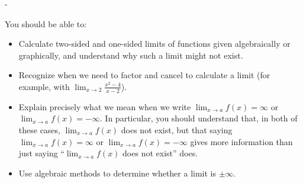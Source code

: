 \documentclass{article}
\makeatletter
\newlength{\tipmargin}
\renewenvironment{framed}{
  \setlength{\tipmargin}{\textwidth-\linewidth}
  \advance\@totalleftmargin-\tipmargin
  \def\FrameCommand{\hspace{\tipmargin}\fbox}%
  \advance\linewidth\tipmargin
  \MakeFramed {\advance\hsize-\width \FrameRestore}%
}
{\endMakeFramed}
\makeatother
\begin{document}

\begin{problemonly}
  \begin{framed}

You should be able to:
    \begin{itemize}[topsep=0pt,partopsep=0pt,parsep=8pt,itemsep=0pt]
    \item Calculate two-sided and one-sided limits of functions given algebraically or graphically, and understand why such a limit might not exist.

    \item Recognize when we need to factor and cancel to calculate a limit (for example, with $\displaystyle \lim_{x \to 2} \frac{x^2 - 4}{x - 2}$).

    \item Explain precisely what we mean when we write $\displaystyle \lim_{x \to a} f(x) = \infty$ or $\displaystyle \lim_{x \to a} f(x) = -\infty$. In particular, you should understand that, in both of these cases, $\displaystyle \lim_{x \to a} f(x)$ does not exist, but that saying $\displaystyle \lim_{x \to a} f(x) = \infty$ or $\displaystyle \lim_{x \to a} f(x) = -\infty$ gives more information than just saying ``$\displaystyle \lim_{x \to a} f(x)$ does not exist'' does.

    \item Use algebraic methods to determine whether a limit is $\pm \infty$.

    \end{itemize}
  \end{framed}
\end{problemonly}
\end{document}
